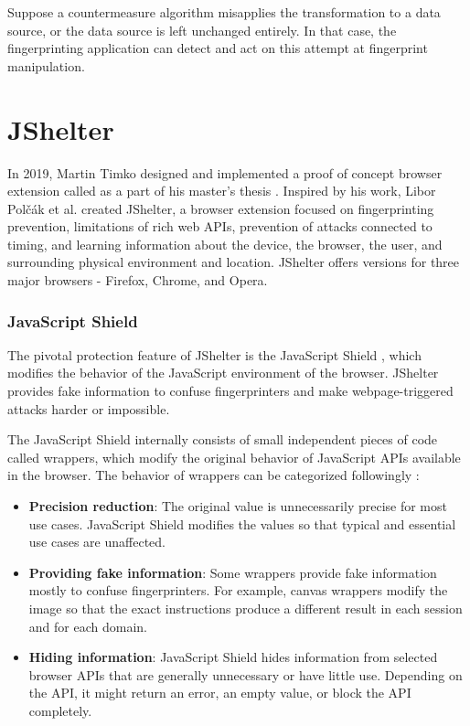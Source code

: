 Suppose a countermeasure algorithm misapplies the transformation to a data source, or the data source is left unchanged entirely. In that case, the fingerprinting application can detect and act on this attempt at fingerprint manipulation.


\chapter{JShelter}
\label{Section:JShelter}

In 2019, Martin Timko designed and implemented a proof of concept browser extension called  as a part of his master's thesis \cite{MatejTimkoDP}. Inspired by his work, Libor Polčák et al. \cite{JShelterPaper} created JShelter, a browser extension focused on fingerprinting prevention, limitations of rich web APIs, prevention of attacks connected to timing, and learning information about the device, the browser, the user, and surrounding physical environment and location. JShelter offers versions for three major browsers - Firefox, Chrome, and Opera.

\subsection{JavaScript Shield}

The pivotal protection feature of JShelter is the JavaScript Shield \cite{JShelterJavaScriptShield}, which modifies the behavior of the JavaScript environment of the browser. JShelter provides fake information to confuse fingerprinters and make webpage-triggered attacks harder or impossible.

The JavaScript Shield internally consists of small independent pieces of code called wrappers, which modify the original behavior of JavaScript APIs available in the browser. The behavior of wrappers can be categorized followingly \cite{JShelterJavaScriptShield}:

\begin{itemize}
	\item \textbf{Precision reduction}: The original value is unnecessarily precise for most use cases. JavaScript Shield modifies the values so that typical and essential use cases are unaffected.
	\item \textbf{Providing fake information}: Some wrappers provide fake information mostly to confuse fingerprinters. For example, canvas wrappers modify the image so that the exact instructions produce a different result in each session and for each domain.
	\item \textbf{Hiding information}: JavaScript Shield hides information from selected browser APIs that are generally unnecessary or have little use. Depending on the API, it might return an error, an empty value, or block the API completely.
\end{itemize}

